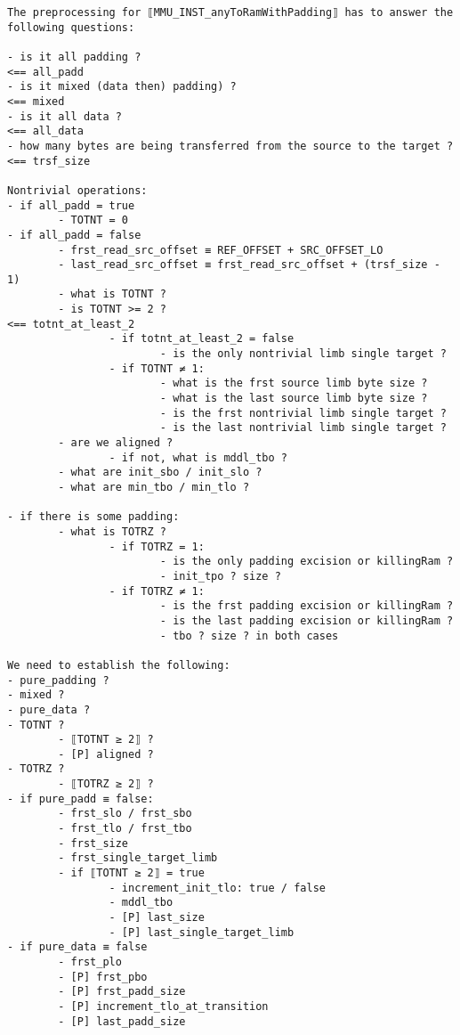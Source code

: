 \documentclass[varwidth=\maxdimen,margin=0.5cm,multi={verbatim}]{standalone}
\begin{document}
\begin{verbatim}
The preprocessing for ⟦MMU_INST_anyToRamWithPadding⟧ has to answer the following questions:

- is it all padding ?                                                        <== all_padd
- is it mixed (data then) padding) ?                                         <== mixed
- is it all data ?                                                           <== all_data
- how many bytes are being transferred from the source to the target ?       <== trsf_size

Nontrivial operations:
- if all_padd = true
        - TOTNT = 0
- if all_padd = false
        - frst_read_src_offset ≡ REF_OFFSET + SRC_OFFSET_LO
        - last_read_src_offset ≡ frst_read_src_offset + (trsf_size - 1)
        - what is TOTNT ?
        - is TOTNT >= 2 ?                                                    <== totnt_at_least_2
                - if totnt_at_least_2 = false
                        - is the only nontrivial limb single target ?
                - if TOTNT ≠ 1:
                        - what is the frst source limb byte size ?
                        - what is the last source limb byte size ?
                        - is the frst nontrivial limb single target ?
                        - is the last nontrivial limb single target ?
        - are we aligned ?
                - if not, what is mddl_tbo ?
        - what are init_sbo / init_slo ?
        - what are min_tbo / min_tlo ?

- if there is some padding:
        - what is TOTRZ ?
                - if TOTRZ = 1:
                        - is the only padding excision or killingRam ?
                        - init_tpo ? size ?
                - if TOTRZ ≠ 1:
                        - is the frst padding excision or killingRam ?
                        - is the last padding excision or killingRam ?
                        - tbo ? size ? in both cases

We need to establish the following:
- pure_padding ?
- mixed ?
- pure_data ?
- TOTNT ?
        - ⟦TOTNT ≥ 2⟧ ?
        - [P] aligned ?
- TOTRZ ?
        - ⟦TOTRZ ≥ 2⟧ ?
- if pure_padd ≡ false:
        - frst_slo / frst_sbo
        - frst_tlo / frst_tbo
        - frst_size
        - frst_single_target_limb
        - if ⟦TOTNT ≥ 2⟧ = true
                - increment_init_tlo: true / false
                - mddl_tbo
                - [P] last_size
                - [P] last_single_target_limb
- if pure_data ≡ false
        - frst_plo
        - [P] frst_pbo
        - [P] frst_padd_size
        - [P] increment_tlo_at_transition
        - [P] last_padd_size



\end{verbatim}
\end{document}
